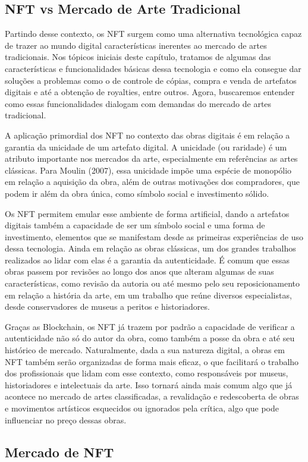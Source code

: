 \subsection{NFT vs Mercado de Arte Tradicional}
\label{subsec: NFT vs Mercado de Arte Tradicional}

Partindo desse contexto, os NFT surgem como uma alternativa tecnológica capaz de trazer ao mundo digital características inerentes ao mercado de artes tradicionais. Nos tópicos iniciais deste capítulo, tratamos de algumas das características e funcionalidades básicas dessa tecnologia e como ela consegue dar soluções a problemas como o de controle de cópias, compra e venda de artefatos digitais e até a obtenção de royalties, entre outros. Agora, buscaremos entender como essas funcionalidades dialogam com demandas do mercado de artes tradicional.

A aplicação primordial dos NFT no contexto das obras digitais é em relação a garantia da unicidade de um artefato digital. A unicidade (ou raridade) é um atributo importante nos mercados da arte, especialmente em referências as artes clássicas. Para Moulin (2007), essa unicidade impõe uma espécie de monopólio em relação a aquisição da obra, além de outras motivações dos compradores, que podem ir além da obra única, como símbolo social e investimento sólido. 

Os NFT permitem emular esse ambiente de forma artificial, dando a artefatos digitais também a capacidade de ser um símbolo social e uma forma de investimento, elementos que se manifestam desde as primeiras experiências de uso dessa tecnologia. Ainda em relação as obras clássicas, um dos grandes trabalhos realizados ao lidar com elas é a garantia da autenticidade. É comum que essas obras passem por revisões ao longo dos anos que alteram algumas de suas características, como revisão da autoria ou até mesmo pelo seu reposicionamento em relação a história da arte, em um trabalho que reúne diversos especialistas, desde conservadores de museus a peritos e historiadores. 

Graças as Blockchain, os NFT já trazem por padrão a capacidade de verificar a autenticidade não só do autor da obra, como também a posse da obra e até seu histórico de mercado. Naturalmente, dada a sua natureza digital, a obras em NFT também serão organizadas de forma mais eficaz, o que facilitará o trabalho dos profissionais que lidam com esse contexto, como responsáveis por museus, historiadores e intelectuais da arte. Isso tornará ainda mais comum algo que já acontece no mercado de artes classificadas, a revalidação e redescoberta de obras e movimentos artísticos esquecidos ou ignorados pela crítica, algo que pode influenciar no preço dessas obras.


\subsection{Mercado de NFT}
\label{subsec: Mercado de NFT}















